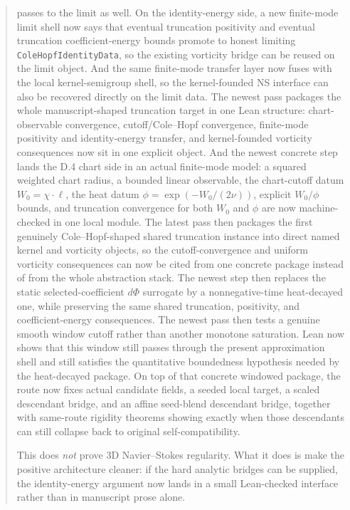 \documentclass[11pt]{article}
\theoremstyle{remark}
\begin{document}
\begin{abstract}
passes to the limit as well.  On the identity-energy side, a new finite-mode
limit shell now says that eventual truncation positivity and eventual
truncation coefficient-energy bounds promote to honest limiting
\texttt{ColeHopfIdentityData}, so the existing vorticity bridge can be reused on
the limit object.  And the same finite-mode transfer layer now fuses with the
local kernel-semigroup shell, so the kernel-founded NS interface can also be
recovered directly on the limit data.  The newest pass packages the whole
manuscript-shaped truncation target in one Lean structure: chart-observable
convergence, cutoff/Cole--Hopf convergence, finite-mode positivity and
identity-energy transfer, and kernel-founded vorticity consequences now sit in
one explicit object.  And the newest concrete step lands the D.4 chart side in
an actual finite-mode model: a squared weighted chart radius, a bounded linear
observable, the chart-cutoff datum \(W_0 = \chi \cdot \ell\), the heat datum
\(\phi = \exp(-W_0/(2\nu))\), explicit \(W_0/\phi\) bounds, and truncation
convergence for both \(W_0\) and \(\phi\) are now machine-checked in one local
module.  The latest pass then packages the first genuinely Cole--Hopf-shaped
shared truncation instance into direct named kernel and vorticity objects, so
the cutoff-convergence and uniform vorticity consequences can now be cited from
one concrete package instead of from the whole abstraction stack.  The newest
step then replaces the static selected-coefficient \(d\Phi\) surrogate by a
nonnegative-time heat-decayed one, while preserving the same shared
truncation, positivity, and coefficient-energy consequences.  The newest pass
then tests a genuine smooth window cutoff rather than another monotone
saturation.  Lean now shows that this window still passes through the present
approximation shell and still satisfies the quantitative boundedness hypothesis
needed by the heat-decayed package.  On top of that concrete windowed package,
the route now fixes actual candidate fields, a seeded local target, a scaled
descendant bridge, and an affine seed-blend descendant bridge, together with
same-route rigidity theorems showing exactly when those descendants can still
collapse back to original self-compatibility.

This does \emph{not} prove 3D Navier--Stokes regularity.  What it does is make
the positive architecture cleaner: if the hard analytic bridges can be supplied,
the identity-energy argument now lands in a small Lean-checked interface rather
than in manuscript prose alone.
\end{abstract}
\end{document}
